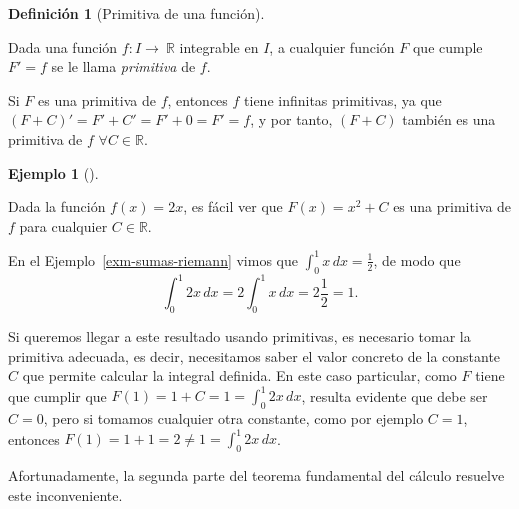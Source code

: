 \documentclass[
  a4paper,
]{scrreport}
\theoremstyle{plain}
\theoremstyle{definition}
\theoremstyle{plain}
\theoremstyle{plain}
\theoremstyle{definition}
\newtheorem{example}{Ejemplo}[chapter]
\theoremstyle{definition}
\newtheorem{definition}{Definición}[chapter]
\theoremstyle{remark}
\begin{document}
\begin{definition}[Primitiva de una
función]\protect\hypertarget{def-primitiva}{}\label{def-primitiva}

Dada una función \(f:I\to\ \mathbb{R}\) integrable en \(I\), a cualquier
función \(F\) que cumple \(F'=f\) se le llama \emph{primitiva} de \(f\).

\end{definition}

\begin{tcolorbox}[enhanced jigsaw, titlerule=0mm, arc=.35mm, colframe=quarto-callout-warning-color-frame, bottomrule=.15mm, opacitybacktitle=0.6, rightrule=.15mm, coltitle=black, colback=white, toprule=.15mm, title=\textcolor{quarto-callout-warning-color}{\faExclamationTriangle}\hspace{0.5em}{Advertencia}, leftrule=.75mm, bottomtitle=1mm, opacityback=0, breakable, colbacktitle=quarto-callout-warning-color!10!white, toptitle=1mm, left=2mm]

Si \(F\) es una primitiva de \(f\), entonces \(f\) tiene infinitas
primitivas, ya que \((F+C)' = F'+C' = F'+0 = F' = f\), y por tanto,
\((F+C)\) también es una primitiva de \(f\) \(\forall C\in\mathbb{R}\).

\end{tcolorbox}

\begin{example}[]\protect\hypertarget{exm-teorema-fundamental-calculo-alternativo}{}\label{exm-teorema-fundamental-calculo-alternativo}

Dada la función \(f(x)=2x\), es fácil ver que \(F(x)=x^2+C\) es una
primitiva de \(f\) para cualquier \(C\in\mathbb{R}\).

En el Ejemplo~\ref{exm-sumas-riemann} vimos que
\(\int_0^1 x\,dx = \frac{1}{2}\), de modo que \[
\int_0^1 2x\,dx = 2 \int_0^1 x\,dx = 2\frac{1}{2} = 1.
\]

Si queremos llegar a este resultado usando primitivas, es necesario
tomar la primitiva adecuada, es decir, necesitamos saber el valor
concreto de la constante \(C\) que permite calcular la integral
definida. En este caso particular, como \(F\) tiene que cumplir que
\(F(1)=1+C = 1=\int_0^1 2x\,dx\), resulta evidente que debe ser \(C=0\),
pero si tomamos cualquier otra constante, como por ejemplo \(C=1\),
entonces \(F(1) = 1+1 = 2\neq 1 = \int_0^1 2x\,dx\).

\end{example}

Afortunadamente, la segunda parte del teorema fundamental del cálculo
resuelve este inconveniente.
\end{document}
